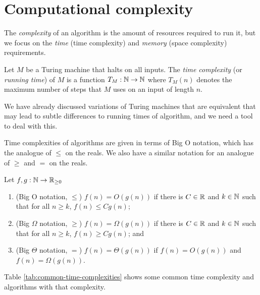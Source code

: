 \section{Computational complexity}

The \emph{complexity} of an algorithm is the amount of resources required to run it, but we focus on the \emph{time} (time complexity) and \emph{memory} (space complexity) requirements.

\begin{definition} \label{def:time-complexity}
    Let $M$ be a Turing machine that halts on all inputs. The \emph{time complexity} (or \emph{running time}) of $M$ is a function $T_M: \mathbb N \to \mathbb N$ where $T_M(n)$ denotes the maximum number of steps that $M$ uses on an input of length $n$.
\end{definition}

We have already discussed variations of Turing machines that are equivalent that may lead to subtle differences to running times of algorithm, and we need a tool to deal with this.

Time complexities of algorithms are given in terms of Big O notation, which has the analogue of $\leq$ on the reals. We also have a similar notation for an analogue of $\geq$ and $=$ on the reals.

\begin{definition}
    Let $f, g: \mathbb N \to \mathbb R_{\geq 0}$
    \begin{enumerate}
        \item (Big O notation, $\leq$) $f(n) = O(g(n))$ if there is $C \in \mathbb R$ and $k \in \mathbb N$ such that for all $n \geq k$, $f(n) \leq Cg(n)$;
        \item (Big $\Omega$ notation, $\geq$) $f(n) = \Omega(g(n))$ if there is $C \in \mathbb R$ and $k \in \mathbb N$ such that for all $n \geq k$, $f(n) \geq Cg(n)$; and 
        \item (Big $\Theta$ notation, $=$) $f(n) = \Theta(g(n))$ if $f(n) = O(g(n))$ and $f(n) = \Omega(g(n))$.
    \end{enumerate}
\end{definition}

Table \ref{tab:common-time-complexities} shows some common time complexity and algorithms with that complexity.

